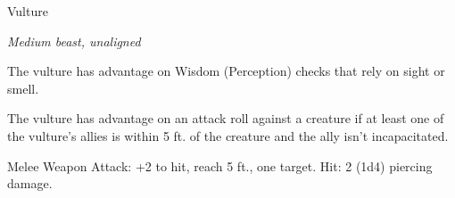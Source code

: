 \begin{monsterbox}{Vulture}
\begin{hangingpar}
\textit{Medium beast, unaligned}
\end{hangingpar}
\dndline%
\basics[%
armorclass = 10,
hitpoints = 1d8 + 1,
speed = {10 ft., fly 50 ft.}
]
\dndline%
\stats[%
STR = \stat{7},
DEX = \stat{10},
CON = \stat{13},
INT = \stat{2},
WIS = \stat{12},
CHA = \stat{4}
]
\dndline%
\details[%
skills={Perception +3, },
damageimmunities={},
savingthrows={},
conditionimmunities={},
damageresistances={},
damagevulnerabilities={},
senses={passive Perception 13},
challenge=0
]
\dndline%
\begin{monsteraction}
The vulture has advantage on Wisdom (Perception) checks that rely on sight or smell.
\end{monsteraction}
\begin{monsteraction}
The vulture has advantage on an attack roll against a creature if at least one of the vulture's allies is within 5 ft. of the creature and the ally isn't incapacitated.
\end{monsteraction}
\begin{monsteraction}[Beak]
Melee Weapon Attack: +2 to hit, reach 5 ft., one target. Hit: 2 (1d4) piercing damage.
\end{monsteraction}
\end{monsterbox}